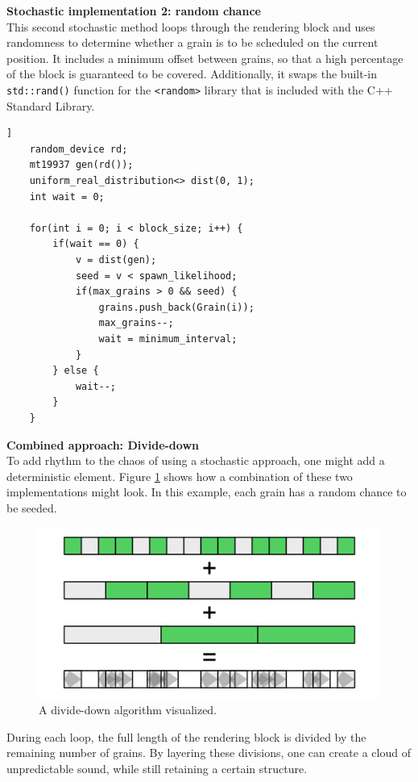 \documentclass[10pt, twocolumn]{IEEEtran}
\begin{document}
\textbf{Stochastic implementation 2: random chance}\\
This second stochastic method loops through the rendering block and uses randomness to determine whether a grain is to be scheduled on the current position. It includes a minimum offset between grains, so that a high percentage of the block is guaranteed to be covered. Additionally, it swaps the built-in \lstinline|std::rand()| function for the \lstinline|<random>| library that is included with the C++ Standard Library.
\begin{minipage}{\linewidth}
\begin{lstlisting}[caption={A stochastic method of grain seeding, using \lstinline|<random>|}]]
	random_device rd;
	mt19937 gen(rd());
	uniform_real_distribution<> dist(0, 1);
	int wait = 0;

	for(int i = 0; i < block_size; i++) {
		if(wait == 0) {
			v = dist(gen);
			seed = v < spawn_likelihood;
			if(max_grains > 0 && seed) {
				grains.push_back(Grain(i));
				max_grains--;
				wait = minimum_interval;
			}
		} else {
			wait--;
		}
	}
\end{lstlisting}
\end{minipage}

\textbf{Combined approach: Divide-down}\\
To add rhythm to the chaos of using a stochastic approach, one might add a deterministic element. Figure \ref{fig:divide_down} shows how a combination of these two implementations might look. In this example, each grain has a random chance to be seeded. \\ 
\begin{figure}[ht!]
	\includegraphics[width=\linewidth]{divide_down.png}
	\caption{A divide-down algorithm visualized.}
	\label{fig:divide_down}
\end{figure}

During each loop, the full length of the rendering block is divided by the remaining number of grains. By layering these divisions, one can create a cloud of unpredictable sound, while still retaining a certain structure.
\end{document}
